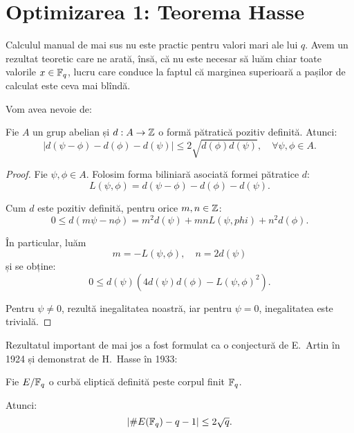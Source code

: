 
\section{Optimizarea 1: Teorema Hasse}

Calculul manual de mai sus nu este practic pentru valori mari ale lui $ q $.
Avem un rezultat teoretic care ne arată, însă, că nu este necesar să luăm
chiar toate valorile $ x \in \mathbb{F}_q $, lucru care conduce la faptul că
marginea superioară a pașilor de calculat este ceva mai blîndă.

Vom avea nevoie de:
\begin{lemma}\label{le:deg-hasse}
  Fie $ A $ un grup abelian și $ d : A \to \mathbb{Z} $ o formă pătratică
  pozitiv definită. Atunci:
  \[
    | d(\psi - \phi) - d(\phi) - d(\psi)| \leq 2 \sqrt{d(\phi)d(\psi)}, %
    \quad \forall \psi, \phi \in A.
  \]
\end{lemma}

\begin{proof}
  Fie $ \psi, \phi \in A $. Folosim forma biliniară asociată formei
  pătratice $ d $:
  \[
    L(\psi, \phi) = d(\psi - \phi) - d(\phi) - d(\psi).
  \]

  Cum $ d $ este pozitiv definită, pentru orice $ m, n \in \mathbb{Z} $:
  \[
    0 \leq d(m\psi - n\phi) = m^2 d(\psi) + mnL(\psi, phi) + n^2 d(\phi).
  \]

  În particular, luăm
  \[
    m = -L(\psi, \phi), \quad n = 2 d(\psi)
  \]
  și se obține:
  \[
    0 \leq d(\psi)\left(4d(\psi)d(\phi) - L(\psi, \phi)^2\right).
  \]

  Pentru $ \psi \neq 0 $, rezultă inegalitatea noastră,
  iar pentru $ \psi = 0 $, inegalitatea este trivială.
\end{proof}

Rezultatul important de mai jos a fost formulat ca o conjectură de E.\ Artin
în 1924 și demonstrat de H.\ Hasse în 1933:
\begin{theorem}[Hasse]\label{thm:hasse}
  Fie $ E/\mathbb{F}_q $ o curbă eliptică definită peste corpul finit $ \mathbb{F}_q $.

  Atunci:
  \[
    \left| \# E(\mathbb{F}_q) - q - 1 \right| \leq 2 \sqrt{q}.
  \]
\end{theorem}


